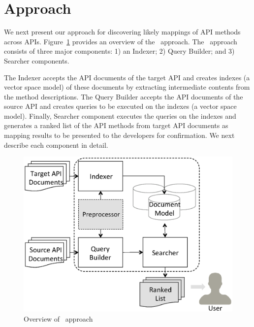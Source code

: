 \vspace*{-1ex}
\section{Approach}
\label{sec:approach}
\vspace*{-1ex}

We next present our approach for discovering 
likely mappings of API methods  across APIs. 
Figure~\ref{fig:approachOverview} provides an overview of the \tool\ approach.
The \tool\ approach consists of three major components: 1) an Indexer; 2) Query Builder; and 3) Searcher components.


The Indexer accepts the API documents of the target API
and creates indexes (a vector space model) of these documents 
by extracting intermediate contents from the method descriptions. 
The Query Builder accepts the API documents of the source API
and creates queries to be executed on the indexes (a vector space model).
Finally, Searcher component executes the queries on the indexes and 
generates a ranked list of the API methods from target API documents as
mapping results to be presented to the developers for confirmation. 
We next describe each component in detail.


\begin{figure}
	\begin{center}
		\includegraphics[scale=0.45,clip=true, trim=120pt 80pt 10pt 80pt]{ApproahOverview.eps}
		\vspace*{-4ex}
		\caption{\label{fig:approachOverview} Overview of \tool\ approach}
	\end{center}
	\vspace*{-4ex}
\end{figure}


